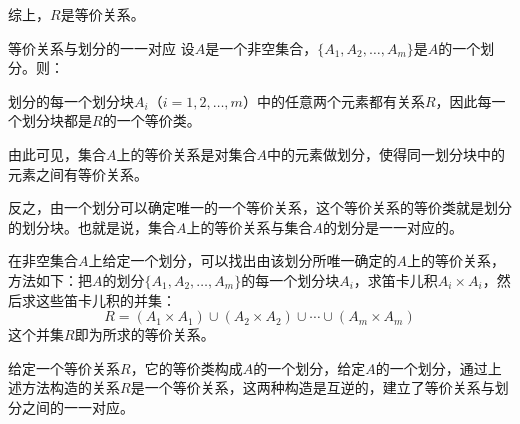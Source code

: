 综上，$R$是等价关系。
\begin{theorem}{等价关系与划分的一一对应}{}
设$A$是一个非空集合，$\{A_1, A_2, \ldots, A_m\}$是$A$的一个划分。则：

划分的每一个划分块$A_i$（$i=1,2,\ldots,m$）中的任意两个元素都有关系$R$，因此每一个划分块都是$R$的一个等价类。
    
由此可见，集合$A$上的等价关系是对集合$A$中的元素做划分，使得同一划分块中的元素之间有等价关系。
    
反之，由一个划分可以确定唯一的一个等价关系，这个等价关系的等价类就是划分的划分块。也就是说，集合$A$上的等价关系与集合$A$的划分是一一对应的。
    
在非空集合$A$上给定一个划分，可以找出由该划分所唯一确定的$A$上的等价关系，方法如下：把$A$的划分$\{A_1, A_2, \ldots, A_m\}$的每一个划分块$A_i$，求笛卡儿积$A_i \times A_i$，然后求这些笛卡儿积的并集：
    \[
    R = (A_1 \times A_1) \cup (A_2 \times A_2) \cup \cdots \cup (A_m \times A_m)
    \]
这个并集$R$即为所求的等价关系。
\end{theorem}
给定一个等价关系$R$，它的等价类构成$A$的一个划分，给定$A$的一个划分，通过上述方法构造的关系$R$是一个等价关系，这两种构造是互逆的，建立了等价关系与划分之间的一一对应。

